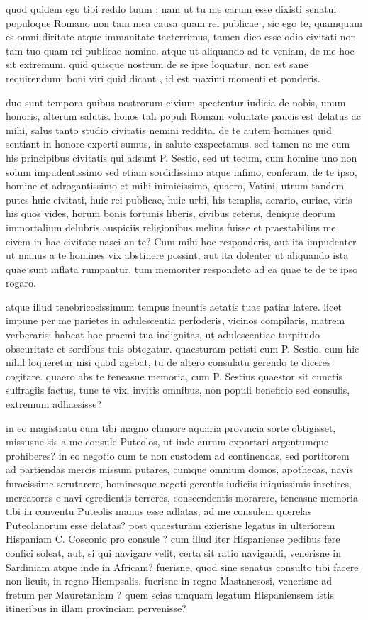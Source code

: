  quod quidem ego tibi reddo tuum ; nam ut tu me carum esse dixisti senatui populoque Romano non tam mea causa quam rei publicae , sic ego te, quamquam es omni diritate atque immanitate taeterrimus, tamen dico esse odio civitati non tam tuo quam rei publicae nomine. atque ut aliquando ad te veniam, de me hoc sit extremum. quid quisque nostrum de se ipse loquatur, non est sane requirendum: boni viri quid dicant , id est maximi momenti et ponderis.

 duo sunt tempora quibus nostrorum civium spectentur iudicia de nobis, unum honoris, alterum salutis. honos tali populi Romani voluntate paucis est delatus ac mihi, salus tanto studio civitatis nemini reddita. de te autem homines quid sentiant in honore experti sumus, in salute exspectamus. sed tamen ne me cum his principibus civitatis qui adsunt P. Sestio, sed ut tecum, cum homine uno non solum impudentissimo sed etiam sordidissimo atque infimo, conferam, de te ipso, homine et adrogantissimo et mihi inimicissimo, quaero, Vatini, utrum tandem putes huic civitati, huic rei publicae, huic urbi, his templis, aerario, curiae, viris his quos vides, horum bonis fortunis liberis, civibus ceteris, denique deorum immortalium delubris auspiciis religionibus melius fuisse et praestabilius me civem in hac civitate nasci an te? Cum mihi hoc responderis, aut ita impudenter ut manus a te homines vix abstinere possint, aut ita dolenter ut aliquando ista quae sunt inflata rumpantur, tum memoriter respondeto ad ea quae te de te ipso rogaro.

 atque illud tenebricosissimum tempus ineuntis aetatis tuae patiar latere. licet impune per me parietes in adulescentia perfoderis, vicinos compilaris, matrem verberaris: habeat hoc praemi tua indignitas, ut adulescentiae turpitudo obscuritate et sordibus tuis obtegatur. quaesturam petisti cum P. Sestio, cum hic nihil loqueretur nisi quod agebat, tu de altero consulatu gerendo te diceres cogitare. quaero abs te teneasne memoria, cum P. Sestius quaestor sit cunctis suffragiis factus, tunc te vix, invitis omnibus, non populi beneficio sed consulis, extremum adhaesisse?

 in eo magistratu cum tibi magno clamore aquaria provincia sorte obtigisset, missusne sis a me consule Puteolos, ut inde aurum exportari argentumque prohiberes? in eo negotio cum te non custodem ad continendas, sed portitorem ad partiendas mercis missum putares, cumque omnium domos, apothecas, navis furacissime scrutarere, hominesque negoti gerentis iudiciis iniquissimis inretires, mercatores e navi egredientis terreres, conscendentis morarere, teneasne memoria tibi in conventu Puteolis manus esse adlatas, ad me consulem querelas Puteolanorum esse delatas? post quaesturam exierisne legatus in ulteriorem Hispaniam C. Cosconio pro consule ? cum illud iter Hispaniense pedibus fere confici soleat, aut, si qui navigare velit, certa sit ratio navigandi, venerisne in Sardiniam atque inde in Africam? fuerisne, quod sine senatus consulto tibi facere non licuit, in regno Hiempsalis, fuerisne in regno Mastanesosi, venerisne ad fretum per Mauretaniam ? quem scias umquam legatum Hispaniensem istis itineribus in illam provinciam pervenisse?

